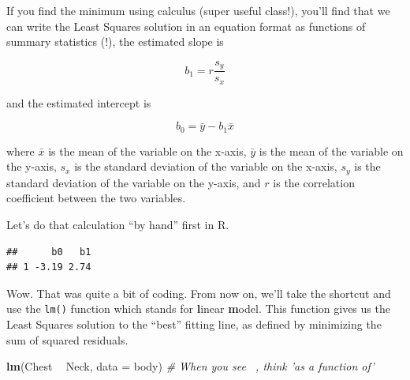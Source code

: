 \documentclass[]{book}
\newenvironment{Shaded}{\begin{snugshade}}{\end{snugshade}}
\newcommand{\CommentTok}[1]{\textcolor[rgb]{0.56,0.35,0.01}{\textit{#1}}}
\newcommand{\DataTypeTok}[1]{\textcolor[rgb]{0.13,0.29,0.53}{#1}}
\newcommand{\KeywordTok}[1]{\textcolor[rgb]{0.13,0.29,0.53}{\textbf{#1}}}
\newcommand{\NormalTok}[1]{#1}
\newcommand{\OperatorTok}[1]{\textcolor[rgb]{0.81,0.36,0.00}{\textbf{#1}}}
\newcommand{\StringTok}[1]{\textcolor[rgb]{0.31,0.60,0.02}{#1}}
\begin{document}
If you find the minimum using calculus (super useful class!), you'll find that we can write the Least Squares solution in an equation format as functions of summary statistics (!), the estimated slope is

\[ b_1  = r\frac{s_y}{s_x}\]

and the estimated intercept is

\[ b_0 = \bar{y} - b_1\bar{x} \]

where \(\bar{x}\) is the mean of the variable on the x-axis, \(\bar{y}\) is the mean of the variable on the y-axis, \(s_x\) is the standard deviation of the variable on the x-axis, \(s_y\) is the standard deviation of the variable on the y-axis, and \(r\) is the correlation coefficient between the two variables.

Let's do that calculation ``by hand'' first in R.

\begin{Shaded}
\end{Shaded}

\begin{verbatim}
##      b0   b1
## 1 -3.19 2.74
\end{verbatim}

Wow. That was quite a bit of coding. From now on, we'll take the shortcut and use the \texttt{lm()} function which stands for \textbf{l}inear \textbf{m}odel. This function gives us the Least Squares solution to the ``best'' fitting line, as defined by minimizing the sum of squared residuals.

\begin{Shaded}
\begin{Highlighting}[]
\KeywordTok{lm}\NormalTok{(Chest }\OperatorTok{~}\StringTok{ }\NormalTok{Neck, }\DataTypeTok{data =}\NormalTok{ body) }\CommentTok{# When you see ~, think 'as a function of'}
\end{Highlighting}
\end{Shaded}
\end{document}
